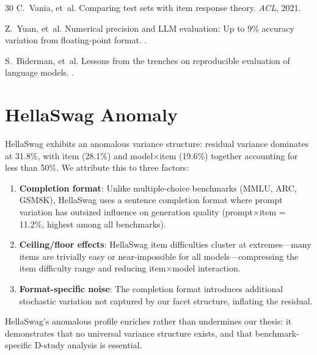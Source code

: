 \documentclass[11pt,letterpaper]{article}
\begin{document}
\begin{thebibliography}{30}
C.~Vania, et~al.
\newblock Comparing test sets with item response theory.
\newblock \emph{ACL}, 2021.

Z.~Yuan, et~al.
\newblock Numerical precision and {LLM} evaluation: Up to 9\% accuracy variation from floating-point format.
.

S.~Biderman, et~al.
\newblock Lessons from the trenches on reproducible evaluation of language models.
.

\end{thebibliography}

\appendix

\section{HellaSwag Anomaly}
\label{app:hellaswag}

HellaSwag exhibits an anomalous variance structure: residual variance dominates at 31.8\%, with item (28.1\%) and model$\times$item (19.6\%) together accounting for less than 50\%. We attribute this to three factors:

\begin{enumerate}
\item \textbf{Completion format}: Unlike multiple-choice benchmarks (MMLU, ARC, GSM8K), HellaSwag uses a sentence completion format where prompt variation has outsized influence on generation quality (prompt$\times$item = 11.2\%, highest among all benchmarks).
\item \textbf{Ceiling/floor effects}: HellaSwag item difficulties cluster at extremes---many items are trivially easy or near-impossible for all models---compressing the item difficulty range and reducing item$\times$model interaction.
\item \textbf{Format-specific noise}: The completion format introduces additional stochastic variation not captured by our facet structure, inflating the residual.
\end{enumerate}

HellaSwag's anomalous profile enriches rather than undermines our thesis: it demonstrates that no universal variance structure exists, and that benchmark-specific D-study analysis is essential.
\end{document}
